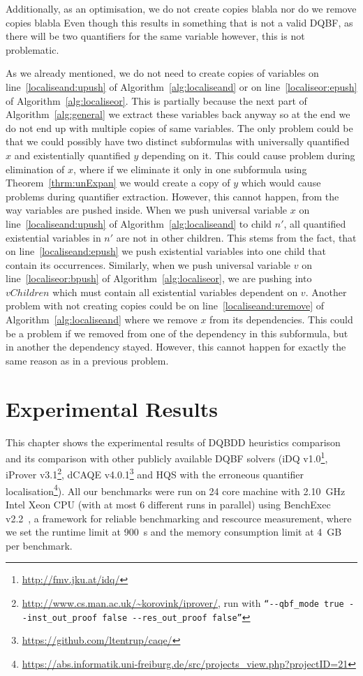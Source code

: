 \documentclass[
  digital, %
  color,
  twoside, %
  table,   %
  nolof,     %
  nolot,     %
]{fithesis3}
\theoremstyle{definition}
\theoremstyle{remark}
\begin{document}
Additionally, as an optimisation, we do not create copies blabla nor do we remove copies blabla Even though this results in something that is not a valid DQBF, as there will be two quantifiers for the same variable however, this is not problematic.

As we already mentioned, we do not need to create copies of variables on line~\ref{localiseand:upush} of Algorithm~\ref{alg:localiseand} or on line~\ref{localiseor:epush} of Algorithm~\ref{alg:localiseor}. This is partially because the next part of Algorithm~\ref{alg:general} we extract these variables back anyway so at the end we do not end up with multiple copies of same variables. The only problem could be that we could possibly have two distinct subformulas with universally quantified $x$ and existentially quantified $y$ depending on it. This could cause problem during elimination of $x$, where if we eliminate it only in one subformula using Theorem~\ref{thrm:unExpan} we would create a copy of $y$ which would cause problems during quantifier extraction. However, this cannot happen, from the way variables are pushed inside. When we push universal variable $x$ on line~\ref{localiseand:upush} of Algorithm~\ref{alg:localiseand} to child $n'$, all quantified existential variables in $n'$ are not in other children. This stems from the fact, that on line~\ref{localiseand:epush} we push existential variables into one child that contain its occurrences. Similarly, when we push universal variable $v$ on line~\ref{localiseor:bpush} of Algorithm~\ref{alg:localiseor}, we are pushing into $vChildren$ which must contain all existential variables dependent on $v$. Another problem with not creating copies could be on line~\ref{localiseand:uremove} of Algorithm~\ref{alg:localiseand} where we remove $x$ from its dependencies. This could be a problem if we removed from one of the dependency in this subformula, but in another the dependency stayed. However, this cannot happen for exactly the same reason as in a previous problem.

\chapter{Experimental Results}
\label{chap:experiments}
This chapter shows the experimental results of DQBDD heuristics comparison and its comparison with other publicly available DQBF solvers 
(iDQ v1.0\footnote{\url{http://fmv.jku.at/idq/}},
iProver v3.1\footnote{\url{http://www.cs.man.ac.uk/~korovink/iprover/}, run with \texttt{``-{}-qbf\_mode true -{}-inst\_out\_proof false -{}-res\_out\_proof false''}},
dCAQE v4.0.1\footnote{\url{https://github.com/ltentrup/caqe/}}
and HQS with the erroneous quantifier localisation\footnote{\url{https://abs.informatik.uni-freiburg.de/src/projects_view.php?projectID=21}}). All our benchmarks were run on 24 core machine with \SI{2.10}{GHz} Intel Xeon CPU (with at most 6 different runs in parallel) using BenchExec v2.2~\cite{benchexec}, a framework for reliable benchmarking and rescource measurement, where we set the runtime limit at \SI{900}{s} and the memory consumption limit at \SI{4}{GB} per benchmark.
\end{document}
